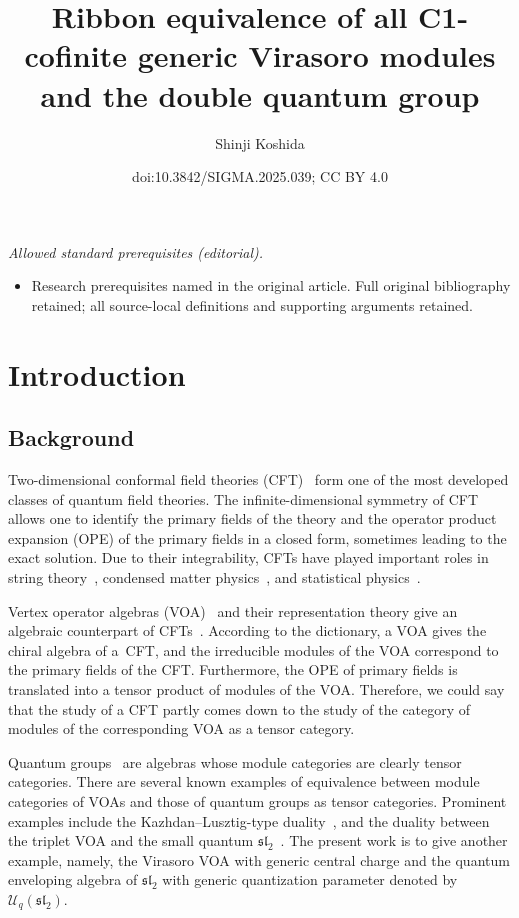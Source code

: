 \documentclass[10pt,a4paper]{amsart}
\title{Ribbon equivalence of all C1-cofinite generic Virasoro modules and the double quantum group}
\author{Shinji Koshida}
\date{doi:10.3842/SIGMA.2025.039; CC BY 4.0}
\numberwithin{equation}{section}
\newcommand{\cU}{\mathcal{U}}
\newcommand{\fsl}{\mathfrak{sl}}
\newcommand{\UEA}{\cU}
\newcommand{\Uq}{\UEA_{q}}
\begin{document}
\maketitle
\noindent\textit{Allowed standard prerequisites (editorial).}\begin{itemize}
\item Research prerequisites named in the original article. Full original bibliography retained; all source-local definitions and supporting arguments retained.
\end{itemize}\medskip
\section{Introduction}
\subsection{Background}
Two-dimensional conformal field theories (CFT)~\cite{BPZ1984b,DMS_yellow_CFT} form one of the most developed classes of quantum field theories.
The infinite-dimensional symmetry of CFT allows one to identify the primary fields of the theory and the operator product expansion (OPE) of the primary fields in a closed form, sometimes leading to the exact solution.
Due to their integrability, CFTs have played important roles in string theory~\cite{GreenSchwarzWitten_superstring}, condensed matter physics~\cite{Hansson_QHall_CFT,Ludwig_CFT_condensed_matter}, and statistical physics~\cite{Cardy_lecture_2008,Mussardo-statistical_field_theory}.

Vertex operator algebras (VOA)~\cite{FLM-VOAs_Monster,Lepowsky_Li-VOA} and their representation theory give an algebraic counterpart of CFTs~\cite{Huang-CFT_and_VOA}.
According to the dictionary, a VOA gives the chiral algebra of a~CFT, and the irreducible modules of the VOA correspond to the primary fields of the CFT.
Furthermore, the OPE of primary fields is translated into a tensor product of modules of the VOA.
Therefore, we could say that the study of a CFT partly comes down to the study of the category of modules of the corresponding VOA as a tensor category.

Quantum groups~\cite{Drinfeld1986} are algebras whose module categories are clearly tensor categories.
There are several known examples of equivalence between module categories of VOAs and those of quantum groups as tensor categories.
Prominent examples include the Kazhdan--Lusztig-type duality~\cite{Drinfeld1989,Finkelberg1996,KL-tensor_structures_affine_Lie-I,KL-tensor_structures_affine_Lie-II,KL-tensor_structures_affine_Lie-III,KL-tensor_structures_affine_Lie-IV,McRae-nonneg_integer_level_affine_Lie_algebra_tensor_cat}, and the duality between the triplet VOA and the small quantum $\fsl_{2}$~\cite{CreutzigLentnerRupert,FeiginGainutdinovSemikhatovTipunin2006a,FeiginGainutdinovSemikhatovTipunin2006b,GannonNegron-quantum_sltwo_and_log_VOAs,KondoSaito2011, NagatomoTsuchiya2011,TsuchiyaWood2013}.
The present work is to give another example, namely, the Virasoro VOA with generic central charge and the quantum enveloping algebra of $\fsl_{2}$ with generic quantization parameter denoted by $\Uq(\fsl_{2})$.
\end{document}
